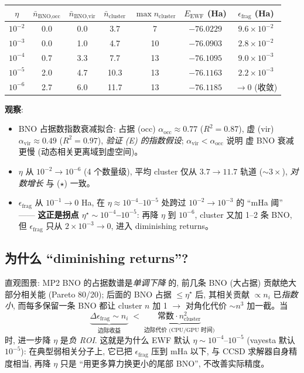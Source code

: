 \documentclass[11pt]{article}
\begin{document}
\begin{center}
\begin{tabular}{ccccccc}
\toprule
$\eta$ & $\bar n_{\text{BNO,occ}}$ & $\bar n_{\text{BNO,vir}}$
       & $\bar n_{\text{cluster}}$ & $\max n_{\text{cluster}}$
       & $E_{\text{EWF}}$ (Ha) & $\epsilon_{\text{frag}}$ (Ha) \\
\midrule
$10^{-2}$ & 0.0 & 0.0 & 3.7 & 7  & $-76.0229$ & $9.6\times10^{-2}$ \\
$10^{-3}$ & 0.0 & 1.0 & 4.7 & 10 & $-76.0903$ & $2.8\times10^{-2}$ \\
$10^{-4}$ & 0.7 & 3.3 & 7.7 & 13 & $-76.1095$ & $9.0\times10^{-3}$ \\
$10^{-5}$ & 2.0 & 4.7 & 10.3 & 13 & $-76.1163$ & $2.2\times10^{-3}$ \\
$10^{-6}$ & 2.7 & 6.0 & 11.7 & 13 & $-76.1185$ & $\to 0$ (收敛) \\
\bottomrule
\end{tabular}
\end{center}

\textbf{观察}:
\begin{itemize}
  \item BNO 占据数指数衰减拟合: 占据 (occ) $\alpha_{\text{occ}}\approx0.77$
        ($R^2{=}0.87$), 虚 (vir) $\alpha_{\text{vir}}\approx0.49$ ($R^2{=}0.97$),
        \emph{验证 (E) 的指数假设}; $\alpha_{\text{vir}}<\alpha_{\text{occ}}$ 说明
        虚 BNO 衰减更慢 (动态相关更离域到虚空间)。
  \item $\eta$ 从 $10^{-2}\to10^{-6}$ (4 个数量级), 平均 cluster 仅从 $3.7\to11.7$
        轨道 ($\sim 3\times$), \emph{对数增长} 与 ($\star$) 一致。
  \item $\epsilon_{\text{frag}}$ 从 $10^{-1}\to0$ Ha, 在
        $\eta\approx 10^{-4}$--$10^{-5}$ 处跨过 $10^{-2}\to10^{-3}$ 的 ``mHa 阈''
        —— \textbf{这正是拐点 $\eta^\star\!\sim\!10^{-4}$--$10^{-5}$}:
        再降 $\eta$ 到 $10^{-6}$, cluster 又加 1--2 条 BNO, 但 $\epsilon_{\text{frag}}$
        只从 $2{\times}10^{-3}\to0$, 进入 diminishing returns。
\end{itemize}

\subsection*{为什么 ``diminishing returns''?}
直观图景: MP2 BNO 的占据数谱是\emph{单调下降} 的, 前几条 BNO (大占据)
贡献绝大部分相关能 (Pareto 80/20); 后面的 BNO 占据 $\le\eta^\star$ 后,
其相关贡献 $\propto n_i$ 已\emph{指数小}, 而每多保留一条 BNO 都让 cluster
$n$ 加 1 $\to$ 对角化代价 $\sim n^3$ 加一截。当
\[
  \underbrace{\Delta\epsilon_{\text{frag}}\sim n_i}_{\text{边际收益}}
  \;<\;
  \underbrace{\text{常数}\cdot n_{\text{cluster}}^2}_{\text{边际代价 (CPU/GPU 时间)}}
\]
时, 进一步降 $\eta$ 是\emph{负 ROI}. 这就是为什么 EWF 默认
$\eta\sim 10^{-4}$--$10^{-5}$ (vayesta 默认 $10^{-5}$): 在典型弱相关分子上,
它已把 $\epsilon_{\text{frag}}$ 压到 mHa 以下, 与 CCSD 求解器自身精度相当,
再降 $\eta$ 只是 ``用更多算力换更小的尾部 BNO'', 不改善实际精度。
\end{document}
